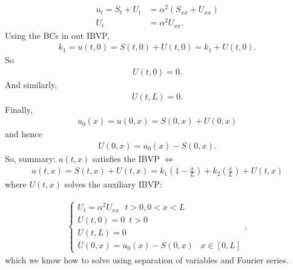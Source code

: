 \documentclass{book}
\theoremstyle{definition}
\begin{document}
\begin{align*}
u_t = S_t + U_t &= \alpha^2 (S_{xx} + U_{xx})\\
U_t &= \alpha^2 U_{xx}.
\end{align*}
Using the BCs in out IBVP,
\begin{align*}
k_1 = u(t,0) = S(t,0) + U(t,0) = k_1 + U(t,0).
\end{align*}
So
\begin{align*}
U(t,0) = 0.
\end{align*}
And similarly,
\begin{align*}
U(t,L) = 0.
\end{align*}
Finally, 
\begin{align*}
u_0(x) = u(0,x) = S(0,x) + U(0,x)
\end{align*}
and hence
\begin{align*}
U(0,x) = u_0(x) - S(0,x).
\end{align*}
So, summary: $u(t,x)$ satisfies the IBVP $\iff$ 
\begin{align*}
u(t,x)=S(t,x)+U(t,x) = k_1\left( 1 - \frac{x}{L} \right) + k_2\left(\frac{x}{L} \right) + U(t,x)
\end{align*}
where $U(t,x)$ solves the auxiliary IBVP:


\begin{align*}
\begin{cases}
U_t = \alpha^2U_{xx}\,\,\,\, t>0,0<x<L\\
U(t,0) = 0\,\,\, t> 0\\
U(t,L) = 0\\
U(0,x) = u_0(x) - S(0,x)\,\,\,\,\, x\in[0,L]
\end{cases},
\end{align*}
which we know how to solve using separation of variables and Fourier series. 
\end{document}
